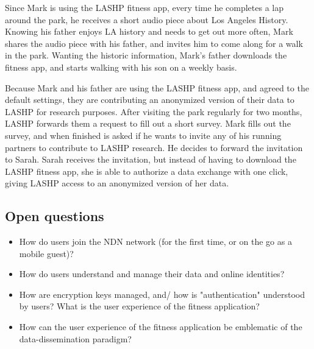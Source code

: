 Since Mark is using the LASHP fitness app, every time he completes a lap around the park, he receives a short audio piece about Los Angeles History. Knowing his father enjoys LA history and needs to get out more often, Mark shares the audio piece with his father, and  invites him to come along for a walk in the park. Wanting the historic information, Mark's father downloads the fitness app, and starts walking with his son on a weekly basis. 

Because Mark and his father are using the LASHP fitness app, and agreed to the default settings, they are contributing an anonymized version of their data to LASHP for research purposes. After visiting the park regularly for two months, LASHP forwards them a request to fill out a short survey. Mark fills out the survey, and when finished is asked if he wants to invite any of his running partners to contribute to LASHP research. He decides to forward the invitation to Sarah. Sarah receives the invitation, but instead of having to download the LASHP fitness app, she is able to authorize a data exchange with one click, giving LASHP access to an anonymized version of her data. 

\subsection{Open questions}
\begin{itemize}
\item How do users join the NDN network (for the first time, or on the go as a mobile guest)? 
\item How do users understand and manage their data and online identities? 
\item How are encryption keys managed, and/ how is "authentication" understood by users? What is the user experience of the fitness application?  
\item How can the user experience of the fitness application be emblematic of the data-dissemination paradigm?  
\end{itemize} 


